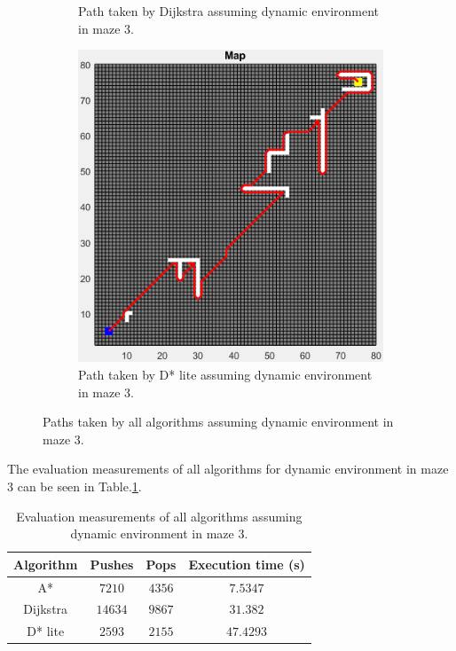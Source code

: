 \begin{figure}
\begin{subfigure}[t]{0.32\columnwidth}
		\caption{Path taken by Dijkstra assuming dynamic environment in maze 3.}
        \label{fig:dijkstra_dynamic_path_maze_3}
	\end{subfigure}
    \hfill
    \begin{subfigure}[t]{0.32\columnwidth}
		\centering
		\includegraphics[width=\textwidth]{images/d_star_lite_dynamic_maze_3.png}
		\caption{Path taken by D* lite assuming dynamic environment in maze 3.}
        \label{fig:d_star_dynamic_path_maze_3}
	\end{subfigure}
	\caption{Paths taken by all algorithms assuming dynamic environment in maze 3.}
    \label{fig:dynamic_path_maze_3}
\end{figure}

The evaluation measurements of all algorithms for dynamic environment in maze 3 can be seen in Table.\:\ref{tab:metric_dynamic_maze_3}.

\begin{table}
    \centering
    \begin{tabular}{c|c|c|c}
        Algorithm   & Pushes    & Pops      & Execution time (s)    \\ \hline
        A*          & $7210$    & $4356$    & $7.5347$              \\
        Dijkstra    & $14634$   & $9867$    & $31.382$              \\
        D* lite     & $2593$    & $2155$    & $47.4293$
    \end{tabular}
    \caption{Evaluation measurements of all algorithms assuming dynamic environment in maze 3.}
    \label{tab:metric_dynamic_maze_3}
\end{table}

